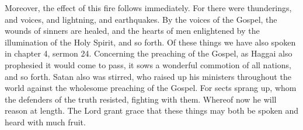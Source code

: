 Moreover, the effect of this fire follows immediately. For there were thunderings, and voices, and lightning, and earthquakes. By the voices of the Gospel, the wounds of sinners are healed, and the hearts of men enlightened by the illumination of the Holy Spirit, and so forth. Of these things we have also spoken in chapter 4, sermon 24. Concerning the preaching of the Gospel, as Haggai also prophesied it would come to pass, it sows a wonderful commotion of all nations, and so forth. Satan also was stirred, who raised up his ministers throughout the world against the wholesome preaching of the Gospel. For sects sprang up, whom the defenders of the truth resisted, fighting with them. Whereof now he will reason at length. The Lord grant grace that these things may both be spoken and heard with much fruit.
